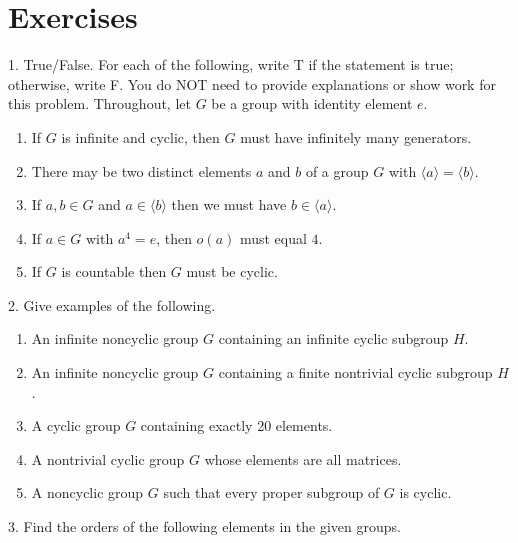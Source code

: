 \documentclass[10pt,]{book}
\theoremstyle{plain}
\theoremstyle{definition}
\theoremstyle{definition}
\theoremstyle{definition}
\theoremstyle{definition}
\numberwithin{equation}{section}
\begin{document}
\section[{Exercises}]{Exercises}\label{exercises-5}
\begin{exerciselist}
\item[1.]\hypertarget{exercise-28}{}True/False. For each of the following, write T if the statement is true; otherwise, write F. You do NOT need to provide explanations or show work for this problem. Throughout, let \(G\) be a group with identity element \(e\). \leavevmode%
\begin{enumerate}[label=(\alph*)]
\item\hypertarget{li-203}{}If \(G\) is infinite and cyclic, then \(G\) must have infinitely many generators.%
\item\hypertarget{li-204}{}There may be two distinct elements \(a\) and \(b\) of a group \(G\) with \(\langle a\rangle =\langle b\rangle\).%
\item\hypertarget{li-205}{}If \(a,b\in G\) and \(a\in \langle b\rangle\) then we must have \(b\in \langle a\rangle\).%
\item\hypertarget{li-206}{}If \(a\in G\) with \(a^4=e\), then \(o(a)\) must equal \(4\).%
\item\hypertarget{li-207}{}If \(G\) is countable then \(G\) must be cyclic.%
\end{enumerate}
%
\par\smallskip
\item[2.]\hypertarget{exercise-29}{}Give examples of the following. \leavevmode%
\begin{enumerate}[label=(\alph*)]
\item\hypertarget{li-213}{}An infinite noncyclic group \(G\) containing an infinite cyclic subgroup \(H\).%
\item\hypertarget{li-214}{}An infinite noncyclic group \(G\) containing a finite nontrivial cyclic subgroup \(H\).%
\item\hypertarget{li-215}{}A cyclic group \(G\) containing exactly 20 elements.%
\item\hypertarget{li-216}{}A nontrivial cyclic group \(G\) whose elements are all matrices.%
\item\hypertarget{li-217}{}A noncyclic group \(G\) such that every proper subgroup of \(G\) is cyclic.%
\end{enumerate}
%
\par\smallskip
\item[3.]\hypertarget{exercise-30}{}Find the orders of the following elements in the given groups. \leavevmode%

\end{exerciselist}
\end{document}
